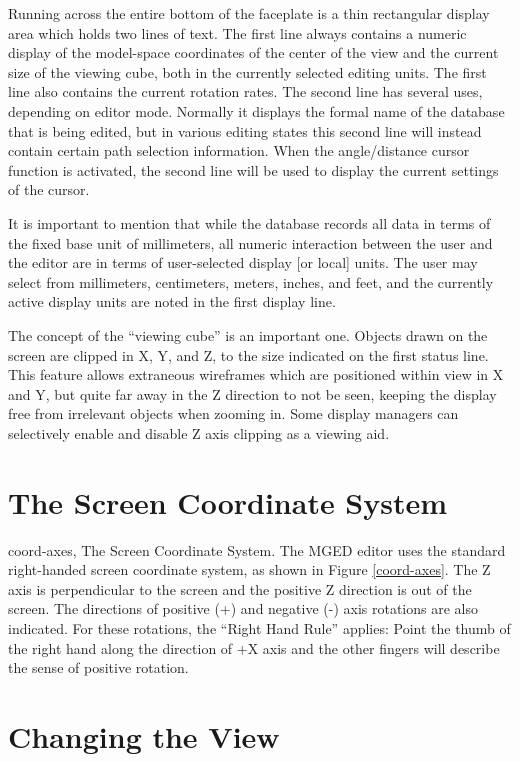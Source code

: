 Running across the entire bottom of the faceplate is a thin rectangular
display area which holds two lines of text.
The first line always contains a numeric display of the model-space
coordinates of the center of the view and the current size of
the viewing cube, both in the currently selected editing units.
The first line also contains the current rotation rates.
The second line has several uses, depending on editor mode.
Normally it displays the formal name of the database that is being
edited, but in various editing states this second line will instead
contain certain path selection information.
When the angle/distance cursor function is activated, the second
line will be used to display the current settings of the cursor.

It is important to mention that while the database records all
data in terms of the fixed base unit of millimeters, all numeric interaction between
the user and the editor are in terms of user-selected display [or local] units.
The user may select from millimeters, centimeters, meters, inches, and
feet, and the currently active display units are noted in the first
display line.

The concept of the ``viewing cube'' is an important one.
Objects drawn on the screen are clipped in X, Y, and Z, to the size
indicated on the first status line.
This feature allows extraneous wireframes which are positioned within view
in X and Y, but quite far away in the Z direction to not be seen,
keeping the display free from irrelevant objects when zooming in.
Some display managers can selectively enable and disable Z axis clipping
as a viewing aid.

\section{The Screen Coordinate System}

\mfig coord-axes, The Screen Coordinate System.
The MGED editor uses the standard right-handed
screen coordinate system,
as shown in Figure \ref{coord-axes}.
The Z axis is perpendicular to the screen and the positive Z direction is
out of the screen.  The directions of positive (+) and negative (-) axis
rotations are also indicated.  For these rotations, the ``Right
Hand Rule'' applies:  Point the thumb of the right hand along the direction
of +X axis and the other fingers will describe the sense of positive
rotation.

\section{Changing the View}

